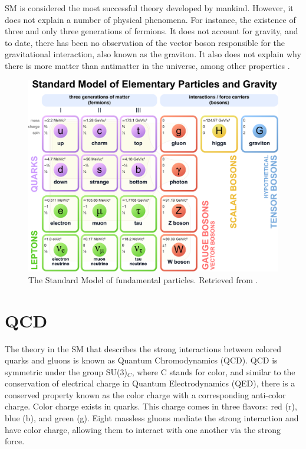 SM is considered the most successful theory developed by mankind. However, it does not explain a number of physical phenomena. For instance, the existence of three and only three generations of fermions. It does not account for gravity, and to date, there has been no observation of the vector boson responsible for the gravitational interaction, also known as the graviton. It also does not explain why there is more matter than antimatter in the universe, among other properties \cite{grummer2021search, danilov2020measurement}.
\begin{figure}[htp!]
	\centering
	\includegraphics[scale=0.34]{MainContent/Figs/SM.eps}
	\caption{The Standard Model of fundamental particles. Retrieved from \cite{danilov2020measurement}.}
	\label{fig:sm}
\end{figure}

\section{QCD}
The theory in the SM that describes the strong interactions between colored quarks and gluons is known as Quantum Chromodynamics (QCD). QCD is symmetric under the group SU(3)$_C$, where C stands for color, and similar to the conservation of electrical charge in Quantum Electrodynamics (QED), there is a conserved property known as the color charge with a corresponding anti-color charge. Color charge exists in quarks. This charge comes in three flavors: red (r), blue (b), and green (g). Eight massless gluons mediate the strong interaction and have color charge, allowing them to interact with one another via the strong force.

